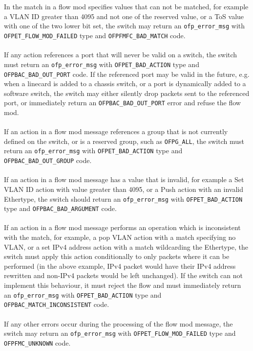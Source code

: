 \documentclass[10pt]{article}
\begin{document}
\\\\
In the match in a flow mod specifies values that can not be matched, for example a VLAN ID greater than 4095 and not one of the reserved value, or a ToS value with one of the two lower bit set, the switch may return an \verb|ofp_error_msg| with \verb|OFPET_FLOW_MOD_FAILED| type and \verb|OFPFMFC_BAD_MATCH| code.
\\\\
If any action references a port that will never be valid on a switch, the switch must return an \verb|ofp_error_msg| with \verb|OFPET_BAD_ACTION| type and \verb|OFPBAC_BAD_OUT_PORT| code.  If the referenced port may be valid in the future, e.g. when a linecard is added to a chassis switch, or a port is dynamically added to a software switch, the switch may either silently drop packets sent to the referenced port, or immediately return an \verb|OFPBAC_BAD_OUT_PORT| error and refuse the flow mod.
\\\\
If an action in a flow mod message references a group that is not currently defined on the switch, or is a reserved group, such as \verb|OFPG_ALL|, the switch must return an \verb|ofp_error_msg| with \verb|OFPET_BAD_ACTION| type and \verb|OFPBAC_BAD_OUT_GROUP| code.
\\\\
If an action in a flow mod message has a value that is invalid, for example a Set VLAN ID action with value greater than 4095, or a Push action with an invalid Ethertype, the switch should return an \verb|ofp_error_msg| with \verb|OFPET_BAD_ACTION| type and \verb|OFPBAC_BAD_ARGUMENT| code.
\\\\
If an action in a flow mod message performs an operation which is inconsistent with the match, for example, a pop VLAN action with a match specifying no VLAN, or a set IPv4 address action with a match wildcarding the Ethertype, the switch must apply this action conditionally to only packets where it can be performed (in the above example, IPv4 packet would have their IPv4 address rewritten and non-IPv4 packets would be left unchanged). If the switch can not implement this behaviour, it must reject the flow and must immediately return an \verb|ofp_error_msg| with \verb|OFPET_BAD_ACTION| type and \verb|OFPBAC_MATCH_INCONSISTENT| code.
\\\\
If any other errors occur during the processing of the flow mod message, the switch may return an  \verb|ofp_error_msg| with \verb|OFPET_FLOW_MOD_FAILED| type and \verb|OFPFMC_UNKNOWN| code.
\end{document}
